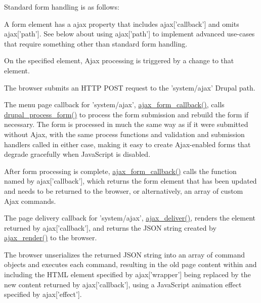 Standard form handling is as follows:
\begin{DoxyItemize}
\item A form element has a ajax property that includes ajax\mbox{[}'callback'\mbox{]} and omits ajax\mbox{[}'path'\mbox{]}. See below about using ajax\mbox{[}'path'\mbox{]} to implement advanced use-\/cases that require something other than standard form handling.
\item On the specified element, Ajax processing is triggered by a change to that element.
\item The browser submits an HTTP POST request to the 'system/ajax' Drupal path.
\item The menu page callback for 'system/ajax', \hyperlink{group__ajax_gabe2739824006df057d291f6be49759ab}{ajax\_\-form\_\-callback()}, calls \hyperlink{group__form__api_ga61186f5c43533761544a778918818fd2}{drupal\_\-process\_\-form()} to process the form submission and rebuild the form if necessary. The form is processed in much the same way as if it were submitted without Ajax, with the same process functions and validation and submission handlers called in either case, making it easy to create Ajax-\/enabled forms that degrade gracefully when JavaScript is disabled.
\item After form processing is complete, \hyperlink{group__ajax_gabe2739824006df057d291f6be49759ab}{ajax\_\-form\_\-callback()} calls the function named by ajax\mbox{[}'callback'\mbox{]}, which returns the form element that has been updated and needs to be returned to the browser, or alternatively, an array of custom Ajax commands.
\item The page delivery callback for 'system/ajax', \hyperlink{group__ajax_ga44a56b3660e97b39f87535a9a2bc8d8a}{ajax\_\-deliver()}, renders the element returned by ajax\mbox{[}'callback'\mbox{]}, and returns the JSON string created by \hyperlink{group__ajax_ga241c2426bdde049c55b05b7bf5d714a2}{ajax\_\-render()} to the browser.
\item The browser unserializes the returned JSON string into an array of command objects and executes each command, resulting in the old page content within and including the HTML element specified by ajax\mbox{[}'wrapper'\mbox{]} being replaced by the new content returned by ajax\mbox{[}'callback'\mbox{]}, using a JavaScript animation effect specified by ajax\mbox{[}'effect'\mbox{]}.
\end{DoxyItemize}

